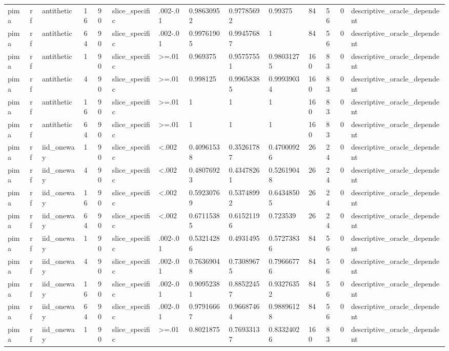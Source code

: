 \begin{tabular}{llllllllllllll}
pima & rf & antithetic & 16 & 90 & slice\_specific & .002-.01 & 0.98630952 & 0.97785692 & 0.99375 & 84 & 56 & 0 & descriptive\_oracle\_dependent \\
pima & rf & antithetic & 64 & 90 & slice\_specific & .002-.01 & 0.99761905 & 0.99457687 & 1 & 84 & 56 & 0 & descriptive\_oracle\_dependent \\
pima & rf & antithetic & 1 & 90 & slice\_specific & >=.01 & 0.969375 & 0.95757551 & 0.98031275 & 160 & 83 & 0 & descriptive\_oracle\_dependent \\
pima & rf & antithetic & 4 & 90 & slice\_specific & >=.01 & 0.998125 & 0.99658385 & 0.99939034 & 160 & 83 & 0 & descriptive\_oracle\_dependent \\
pima & rf & antithetic & 16 & 90 & slice\_specific & >=.01 & 1 & 1 & 1 & 160 & 83 & 0 & descriptive\_oracle\_dependent \\
pima & rf & antithetic & 64 & 90 & slice\_specific & >=.01 & 1 & 1 & 1 & 160 & 83 & 0 & descriptive\_oracle\_dependent \\
pima & rf & iid\_oneway & 1 & 90 & slice\_specific & <.002 & 0.40961538 & 0.35261787 & 0.47000926 & 26 & 24 & 0 & descriptive\_oracle\_dependent \\
pima & rf & iid\_oneway & 4 & 90 & slice\_specific & <.002 & 0.48076923 & 0.43478261 & 0.52619048 & 26 & 24 & 0 & descriptive\_oracle\_dependent \\
pima & rf & iid\_oneway & 16 & 90 & slice\_specific & <.002 & 0.59230769 & 0.53748992 & 0.64348505 & 26 & 24 & 0 & descriptive\_oracle\_dependent \\
pima & rf & iid\_oneway & 64 & 90 & slice\_specific & <.002 & 0.67115385 & 0.61521196 & 0.723539 & 26 & 24 & 0 & descriptive\_oracle\_dependent \\
pima & rf & iid\_oneway & 1 & 90 & slice\_specific & .002-.01 & 0.53214286 & 0.4931495 & 0.57273836 & 84 & 56 & 0 & descriptive\_oracle\_dependent \\
pima & rf & iid\_oneway & 4 & 90 & slice\_specific & .002-.01 & 0.76369048 & 0.73089675 & 0.79666776 & 84 & 56 & 0 & descriptive\_oracle\_dependent \\
pima & rf & iid\_oneway & 16 & 90 & slice\_specific & .002-.01 & 0.90952381 & 0.88522457 & 0.93276352 & 84 & 56 & 0 & descriptive\_oracle\_dependent \\
pima & rf & iid\_oneway & 64 & 90 & slice\_specific & .002-.01 & 0.97916667 & 0.96687464 & 0.98896128 & 84 & 56 & 0 & descriptive\_oracle\_dependent \\
pima & rf & iid\_oneway & 1 & 90 & slice\_specific & >=.01 & 0.8021875 & 0.76933137 & 0.83324026 & 160 & 83 & 0 & descriptive\_oracle\_dependent \\

\end{tabular}
